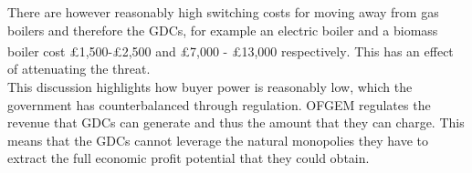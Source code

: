 \documentclass[11pt]{article}		%
\newcommand{\supercite}[1]{\textsuperscript{\cite{#1}}}		%
\begin{document}
                There are however reasonably high switching costs for moving away from gas boilers and therefore the GDCs, for example an electric boiler and a biomass boiler cost £1,500-£2,500 and £7,000 - £13,000 respectively\supercite{boiler_cost}. This has an effect of attenuating the threat.
                \\
                \hspace*{2ex}
                This discussion highlights how buyer power is reasonably low, which the government has counterbalanced through regulation. OFGEM regulates the revenue that GDCs can generate and thus the amount that they can charge. This means that the GDCs cannot leverage the natural monopolies they have to extract the full economic profit potential that they could obtain.
                 
                
                
            
               
\end{document}
